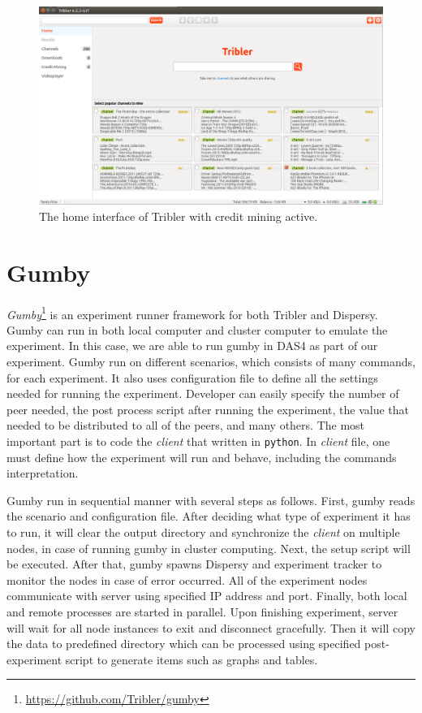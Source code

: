\begin{figure}[h]
	\includegraphics[width=\textwidth]{pics/home_channel.png}
	\caption{The home interface of Tribler with credit mining active.}
	\label{fig:homecm}
\end{figure}

\section{Gumby}
\label{section:gumby}
\textit{Gumby}\footnote{\url{https://github.com/Tribler/gumby}} is an experiment runner framework for both Tribler and Dispersy. Gumby can run in both local computer and cluster computer to emulate the experiment. In this case, we are able to run gumby in DAS4 as part of our experiment. Gumby run on different scenarios, which consists of many commands, for each experiment. It also uses configuration file to define all the settings needed for running the experiment. Developer can easily specify the number of peer needed, the post process script after running the experiment, the value that needed to be distributed to all of the peers, and many others. The most important part is to code the \textit{client} that written in \texttt{python}. In \textit{client} file, one must define how the experiment will run and behave, including the commands interpretation.

Gumby run in sequential manner with several steps as follows. First, gumby reads the scenario and configuration file. After deciding what type of experiment it has to run, it will clear the output directory and synchronize the \textit{client} on multiple nodes, in case of running gumby in cluster computing. Next, the setup script will be executed. After that, gumby spawns Dispersy and experiment tracker to monitor the nodes in case of error occurred. All of the experiment nodes communicate with server using specified IP address and port. Finally, both local and remote processes are started in parallel. Upon finishing experiment, server will wait for all node instances to exit and disconnect gracefully. Then it will copy the data to predefined directory which can be processed using specified post-experiment script to generate items such as graphs and tables.

